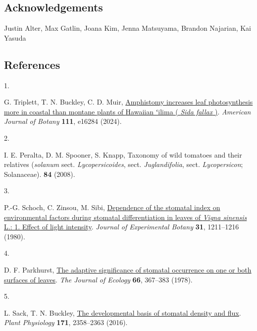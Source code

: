 \documentclass[
  letterpaper,
  DIV=11,
  numbers=noendperiod]{scrartcl}
\newlength{\cslhangindent}
\newlength{\csllabelwidth}
\newenvironment{CSLReferences}[2] %
 {\begin{list}{}{%
  \setlength{\itemindent}{0pt}
  \setlength{\leftmargin}{0pt}
  \setlength{\parsep}{0pt}
  \ifodd #1
   \setlength{\leftmargin}{\cslhangindent}
   \setlength{\itemindent}{-1\cslhangindent}
  \fi
  \setlength{\itemsep}{#2\baselineskip}}}
 {\end{list}}
\newcommand{\CSLLeftMargin}[1]{\parbox[t]{\csllabelwidth}{\strut#1\strut}}
\newcommand{\CSLRightInline}[1]{\parbox[t]{\linewidth - \csllabelwidth}{\strut#1\strut}}
\begin{document}
\subsection{Acknowledgements}\label{acknowledgements}

Justin Alter, Max Gatlin, Joana Kim, Jenna Matsuyama, Brandon Najarian,
Kai Yasuda

\subsection*{References}\label{references}

\label{refs}
\begin{CSLReferences}{0}{1}
\CSLLeftMargin{1. }%
\CSLRightInline{G. Triplett, T. N. Buckley, C. D. Muir,
\href{https://doi.org/10.1002/ajb2.16284}{Amphistomy increases leaf
photosynthesis more in coastal than montane plants of {Hawaiian} ʻilima
( \emph{{Sida} fallax} )}. \emph{American Journal of Botany}
\textbf{111}, e16284 (2024).}

\CSLLeftMargin{2. }%
\CSLRightInline{I. E. Peralta, D. M. Spooner, S. Knapp, Taxonomy of wild
tomatoes and their relatives (\emph{solanum} sect.
\emph{Lycopersicoides}, sect. \emph{Juglandifolia}, sect.
\emph{Lycopersicon}; {Solanaceae}). \textbf{84} (2008).}

\CSLLeftMargin{3. }%
\CSLRightInline{P.-G. Schoch, C. Zinsou, M. Sibi,
\href{https://doi.org/10.1093/jxb/31.5.1211}{Dependence of the stomatal
index on environmental factors during stomatal differentiation in leaves
of \emph{{Vigna} sinensis} {L}.: 1. {Effect} of light intensity}.
\emph{Journal of Experimental Botany} \textbf{31}, 1211--1216 (1980).}

\CSLLeftMargin{4. }%
\CSLRightInline{D. F. Parkhurst,
\href{https://doi.org/10.2307/2259142}{The adaptive significance of
stomatal occurrence on one or both surfaces of leaves}. \emph{The
Journal of Ecology} \textbf{66}, 367--383 (1978).}

\CSLLeftMargin{5. }%
\CSLRightInline{L. Sack, T. N. Buckley,
\href{https://doi.org/10.1104/pp.16.00476}{The developmental basis of
stomatal density and flux}. \emph{Plant Physiology} \textbf{171},
2358--2363 (2016).}


\end{CSLReferences}
\end{document}
